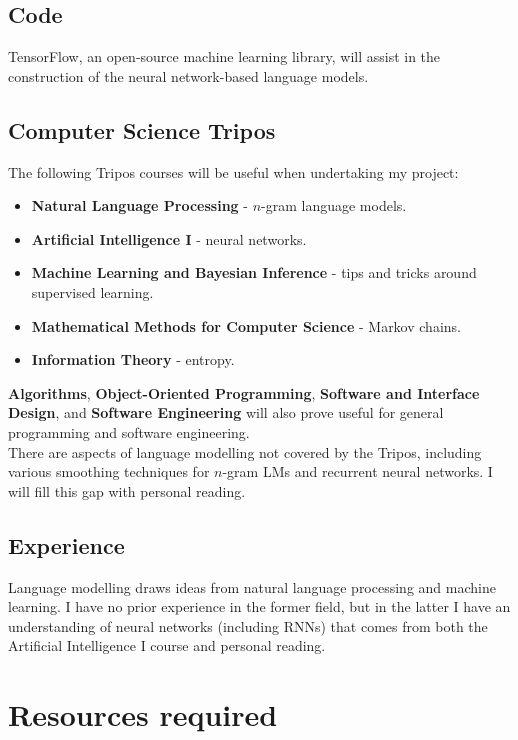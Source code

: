 \documentclass[a4paper, 12pt]{article}
\newcommand{\tbf}[1]{\textbf{#1}}
\begin{document}
\subsection*{Code}
TensorFlow, an open-source machine learning library, will assist in the construction of the neural network-based language models.

\subsection*{Computer Science Tripos}

The following Tripos courses will be useful when undertaking my project:
\begin{itemize}
\item
	\tbf{Natural Language Processing} - $n$-gram language models.
\item
	\tbf{Artificial Intelligence I} - neural networks.
\item
	\tbf{Machine Learning and Bayesian Inference} - tips and tricks around supervised learning.
\item
	\tbf{Mathematical Methods for Computer Science} - Markov chains.
\item
	\tbf{Information Theory} - entropy.
\end{itemize}
\tbf{Algorithms}, \tbf{Object-Oriented Programming}, \tbf{Software and Interface Design}, and \tbf{Software Engineering} will also prove useful for general programming and software engineering. \\

There are aspects of language modelling not covered by the Tripos, including various smoothing techniques for $n$-gram LMs and recurrent neural networks. I will fill this gap with personal reading.

\subsection*{Experience}
Language modelling draws ideas from natural language processing and machine learning. I have no prior experience in the former field, but in the latter I have an understanding of neural networks (including RNNs) that comes from both the Artificial Intelligence I course and personal reading. \\

\section*{Resources required}
\end{document}
